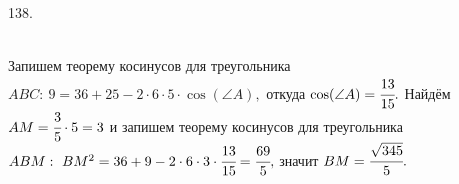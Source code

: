 138. \begin{figure}[ht!]
\end{figure}\\
Запишем теорему косинусов для треугольника $ABC:\ 9=36+25-2\cdot6\cdot5\cdot\cos(\angle A),$ откуда $\cos(\angle A)=\cfrac{13}{15}.$ Найдём $AM=\cfrac{3}{5}\cdot5=3$ и запишем теорему косинусов для треугольника $ABM:\ BM^2=36+9-2\cdot6\cdot3\cdot\cfrac{13}{15}=\cfrac{69}{5},$ значит $BM=\cfrac{\sqrt{345}}{5}.$\\
